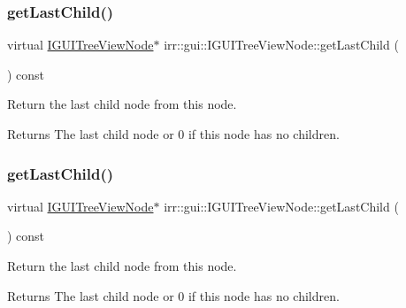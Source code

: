 \subsubsection{\texorpdfstring{get\+Last\+Child()}{getLastChild()}\hspace{0.1cm}{\footnotesize\ttfamily [1/2]}}
{\footnotesize\ttfamily virtual \hyperlink{classirr_1_1gui_1_1IGUITreeViewNode}{I\+G\+U\+I\+Tree\+View\+Node}$\ast$ irr\+::gui\+::\+I\+G\+U\+I\+Tree\+View\+Node\+::get\+Last\+Child (\begin{DoxyParamCaption}{ }\end{DoxyParamCaption}) const\hspace{0.3cm}{\ttfamily [pure virtual]}}



Return the last child node from this node. 

\begin{DoxyReturn}{Returns}
The last child node or 0 if this node has no children. 
\end{DoxyReturn}
\mbox{\label{classirr_1_1gui_1_1IGUITreeViewNode_ad9f08dced84c88360485988af188e296}} 
\subsubsection{\texorpdfstring{get\+Last\+Child()}{getLastChild()}\hspace{0.1cm}{\footnotesize\ttfamily [2/2]}}
{\footnotesize\ttfamily virtual \hyperlink{classirr_1_1gui_1_1IGUITreeViewNode}{I\+G\+U\+I\+Tree\+View\+Node}$\ast$ irr\+::gui\+::\+I\+G\+U\+I\+Tree\+View\+Node\+::get\+Last\+Child (\begin{DoxyParamCaption}{ }\end{DoxyParamCaption}) const\hspace{0.3cm}{\ttfamily [pure virtual]}}



Return the last child node from this node. 

\begin{DoxyReturn}{Returns}
The last child node or 0 if this node has no children. 
\end{DoxyReturn}
\mbox{\label{classirr_1_1gui_1_1IGUITreeViewNode_aa57cadea8ba12bb3533ecf2845cd7971}} 
